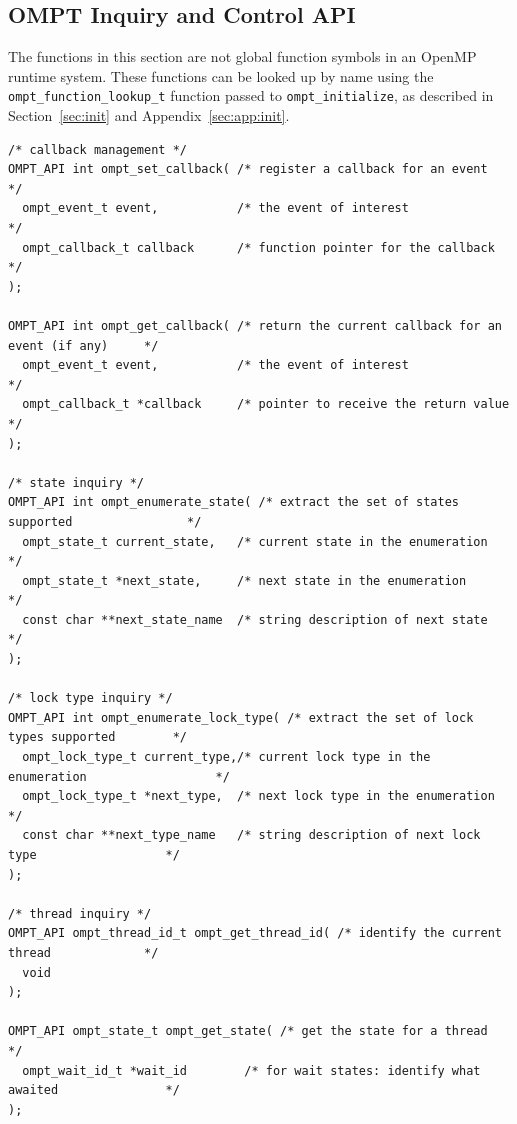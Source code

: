 \documentclass{article}
\begin{document}
{\clearpage
\subsection{OMPT Inquiry and Control API}

The functions in this section are not global function symbols in an OpenMP runtime system. These functions can be looked up by name using the \verb|ompt_function_lookup_t| function passed to \verb|ompt_initialize|, as described in Section~\ref{sec:init} and Appendix~\ref{sec:app:init}.

\begin{verbatim}
/* callback management */
OMPT_API int ompt_set_callback( /* register a callback for an event                      */
  ompt_event_t event,           /* the event of interest                                 */
  ompt_callback_t callback      /* function pointer for the callback                     */
);

OMPT_API int ompt_get_callback( /* return the current callback for an event (if any)     */
  ompt_event_t event,           /* the event of interest                                 */
  ompt_callback_t *callback     /* pointer to receive the return value                   */
);

/* state inquiry */
OMPT_API int ompt_enumerate_state( /* extract the set of states supported                */
  ompt_state_t current_state,   /* current state in the enumeration                      */
  ompt_state_t *next_state,     /* next state in the enumeration                         */
  const char **next_state_name  /* string description of next state                      */
);

/* lock type inquiry */
OMPT_API int ompt_enumerate_lock_type( /* extract the set of lock types supported        */
  ompt_lock_type_t current_type,/* current lock type in the enumeration                  */
  ompt_lock_type_t *next_type,  /* next lock type in the enumeration                     */
  const char **next_type_name   /* string description of next lock type                  */
);

/* thread inquiry */
OMPT_API ompt_thread_id_t ompt_get_thread_id( /* identify the current thread             */
  void
);

OMPT_API ompt_state_t ompt_get_state( /* get the state for a thread                      */
  ompt_wait_id_t *wait_id        /* for wait states: identify what awaited               */
);


\end{verbatim}}
\end{document}
